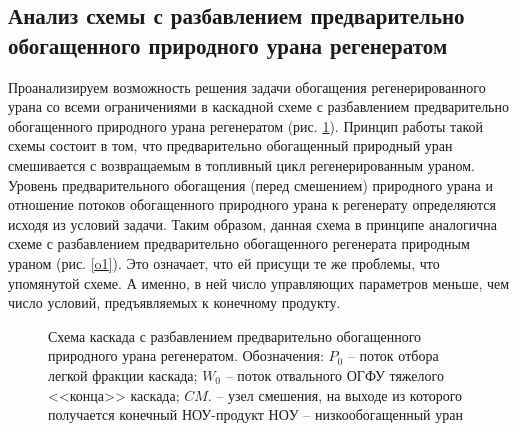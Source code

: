 \subsection{Анализ схемы с разбавлением предварительно обогащенного природного урана регенератом}

Проанализируем возможность решения задачи обогащения регенерированного урана со всеми ограничениями в каскадной схеме с разбавлением предварительно обогащенного природного урана регенератом (рис. \ref{o2}). Принцип работы такой схемы состоит в том, что предварительно обогащенный природный уран смешивается с возвращаемым в топливный цикл регенерированным ураном. Уровень предварительного обогащения (перед смешением) природного урана и отношение потоков обогащенного природного урана к регенерату определяются исходя из условий задачи. Таким образом, данная схема в принципе аналогична схеме с разбавлением предварительно обогащенного регенерата природным ураном (рис. \ref{o1}). Это означает, что ей присущи те же проблемы, что упомянутой схеме. А именно, в ней число управляющих параметров меньше, чем число условий, предъявляемых к конечному продукту. 

\begin{figure}[ht]
  \caption{Схема каскада с разбавлением предварительно обогащенного природного урана регенератом. Обозначения: $P_0$ -- поток отбора легкой фракции каскада; $W_0$ -- поток отвального ОГФУ тяжелого <<конца>> каскада; $CM.$ -- узел смешения, на выходе из которого получается конечный НОУ-продукт $НОУ$  -- низкообогащенный уран}\label{o2}
\end{figure}

